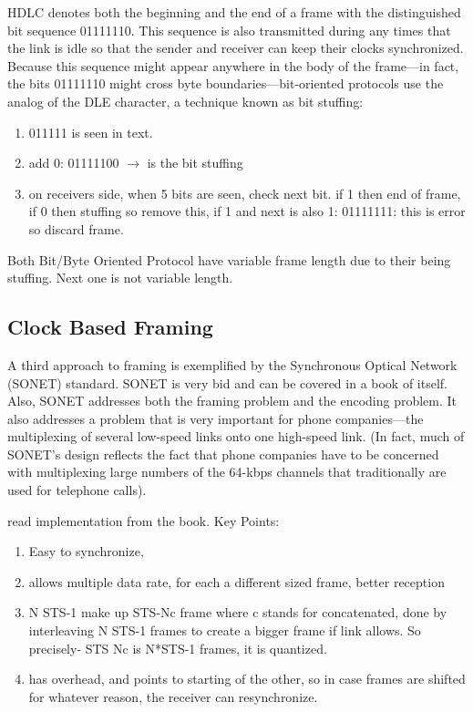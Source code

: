 \documentclass[12pt]{book}
\begin{document}
HDLC denotes both the beginning and the end of a frame with the distinguished bit sequence 01111110. This sequence is also transmitted during any times that the link is idle so that the sender and receiver can keep their clocks synchronized. Because this sequence might appear anywhere in the body of the frame—in fact, the bits 01111110 might cross byte boundaries—bit-oriented protocols use the analog of the DLE character, a technique known as bit stuffing: \begin{enumerate}
    \item 011111 is seen in text.
    \item add 0: 01111100 $\to$ is the bit stuffing
    \item on receivers side, when 5 bits are seen, check next bit. if 1 then end of frame, if 0 then stuffing so remove this, if 1 and next is also 1: 01111111: this is error so discard frame.
\end{enumerate}

Both Bit/Byte Oriented Protocol have variable frame length due to their being stuffing. Next one is not variable length.

\subsection{Clock Based Framing}
A third approach to framing is exemplified by the Synchronous Optical Network (SONET) standard. SONET is very bid and can be covered in a book of itself. Also, SONET addresses both the framing problem and the encoding problem. It also addresses a problem that is very important for phone companies—the multiplexing of several low-speed links onto one high-speed link. (In fact, much of SONET’s design reflects the fact that phone companies have to be concerned with multiplexing large numbers of the 64-kbps channels that traditionally are used for telephone calls).

read implementation from the book.
Key Points:
\begin{enumerate}
    \item Easy to synchronize,
    \item allows multiple data rate, for each a different sized frame, better reception
    \item N STS-1 make up STS-Nc frame where c stands for concatenated, done by interleaving N STS-1 frames to create a bigger frame if link allows. So precisely- STS Nc is N*STS-1 frames, it is quantized.
    \item has overhead, and points to starting of the other, so in case frames are shifted for whatever reason, the receiver can resynchronize.
\end{enumerate}
\end{document}
